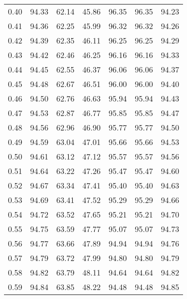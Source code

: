 \begin{tabular}{|c|c|c|c|c|c|c|}
      0.40 &     94.33 &     62.14 &      45.86 &   96.35 &      96.35 &         94.23 \\
      0.41 &     94.36 &     62.25 &      45.99 &   96.32 &      96.32 &         94.26 \\
      0.42 &     94.39 &     62.35 &      46.11 &   96.25 &      96.25 &         94.29 \\
      0.43 &     94.42 &     62.46 &      46.25 &   96.16 &      96.16 &         94.33 \\
      0.44 &     94.45 &     62.55 &      46.37 &   96.06 &      96.06 &         94.37 \\
      0.45 &     94.48 &     62.67 &      46.51 &   96.00 &      96.00 &         94.40 \\
      0.46 &     94.50 &     62.76 &      46.63 &   95.94 &      95.94 &         94.43 \\
      0.47 &     94.53 &     62.87 &      46.77 &   95.85 &      95.85 &         94.47 \\
      0.48 &     94.56 &     62.96 &      46.90 &   95.77 &      95.77 &         94.50 \\
      0.49 &     94.59 &     63.04 &      47.01 &   95.66 &      95.66 &         94.53 \\
      0.50 &     94.61 &     63.12 &      47.12 &   95.57 &      95.57 &         94.56 \\
      0.51 &     94.64 &     63.22 &      47.26 &   95.47 &      95.47 &         94.60 \\
      0.52 &     94.67 &     63.34 &      47.41 &   95.40 &      95.40 &         94.63 \\
      0.53 &     94.69 &     63.41 &      47.52 &   95.29 &      95.29 &         94.66 \\
      0.54 &     94.72 &     63.52 &      47.65 &   95.21 &      95.21 &         94.70 \\
      0.55 &     94.75 &     63.59 &      47.77 &   95.07 &      95.07 &         94.73 \\
      0.56 &     94.77 &     63.66 &      47.89 &   94.94 &      94.94 &         94.76 \\
      0.57 &     94.79 &     63.72 &      47.99 &   94.80 &      94.80 &         94.79 \\
      0.58 &     94.82 &     63.79 &      48.11 &   94.64 &      94.64 &         94.82 \\
      0.59 &     94.84 &     63.85 &      48.22 &   94.48 &      94.48 &         94.85 \\

\end{tabular}
